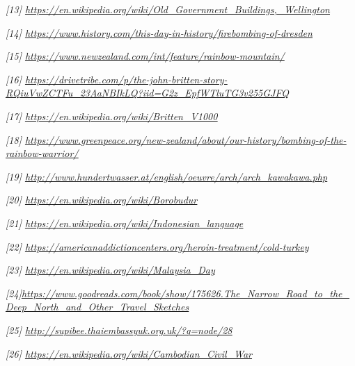 \emph{{[}13{]}
\href{https://en.wikipedia.org/wiki/Old_Government_Buildings,_Wellington}{\underline{https://en.wikipedia.org/wiki/Old\_Government\_Buildings,\_Wellington}}}

\emph{{[}14{]}
\href{https://www.history.com/this-day-in-history/firebombing-of-dresden}{\underline{https://www.history.com/this-day-in-history/firebombing-of-dresden}}}

\emph{{[}15{]}
\underline{https://www.newzealand.com/int/feature/rainbow-mountain/}}

\emph{{[}16{]}
\href{https://drivetribe.com/p/the-john-britten-story-RQiuVwZCTFu_23AaNBIkLQ?iid=G2z_EpfWTluTG3v255GJFQ}{\underline{https://drivetribe.com/p/the-john-britten-story-RQiuVwZCTFu\_23AaNBIkLQ?iid=G2z\_EpfWTluTG3v255GJFQ}}}

\emph{{[}17{]}
\href{https://en.wikipedia.org/wiki/Britten_V1000}{\underline{https://en.wikipedia.org/wiki/Britten\_V1000}}}

\emph{{[}18{]}
\href{https://www.greenpeace.org/new-zealand/about/our-history/bombing-of-the-rainbow-warrior/}{\underline{https://www.greenpeace.org/new-zealand/about/our-history/bombing-of-the-rainbow-warrior/}}}

\emph{{[}19{]}
\href{http://www.hundertwasser.at/english/oeuvre/arch/arch_kawakawa.php}{\underline{http://www.hundertwasser.at/english/oeuvre/arch/arch\_kawakawa.php}}}

\emph{{[}20{]}
\href{https://en.wikipedia.org/wiki/Borobudur}{\underline{https://en.wikipedia.org/wiki/Borobudur}}}

\emph{{[}21{]}
\href{https://en.wikipedia.org/wiki/Indonesian_language}{\underline{https://en.wikipedia.org/wiki/Indonesian\_language}}}

\emph{{[}22{]}
\href{https://americanaddictioncenters.org/heroin-treatment/cold-turkey}{\underline{https://americanaddictioncenters.org/heroin-treatment/cold-turkey}}}

\emph{{[}23{]} \url{https://en.wikipedia.org/wiki/Malaysia_Day}}

\emph{{[}24{]}\href{https://www.goodreads.com/book/show/175626.The_Narrow_Road_to_the_Deep_North_and_Other_Travel_Sketches}{\underline{https://www.goodreads.com/book/show/175626.The\_Narrow\_Road\_to\_the\_Deep\_North\_and\_Other\_Travel\_Sketches}}}

\emph{{[}25{]}
\href{http://supibee.thaiembassyuk.org.uk/?q=node/28}{\underline{http://supibee.thaiembassyuk.org.uk/?q=node/28}}}

\emph{{[}26{]}
\href{https://en.wikipedia.org/wiki/Cambodian_Civil_War}{\underline{https://en.wikipedia.org/wiki/Cambodian\_Civil\_War}}}

